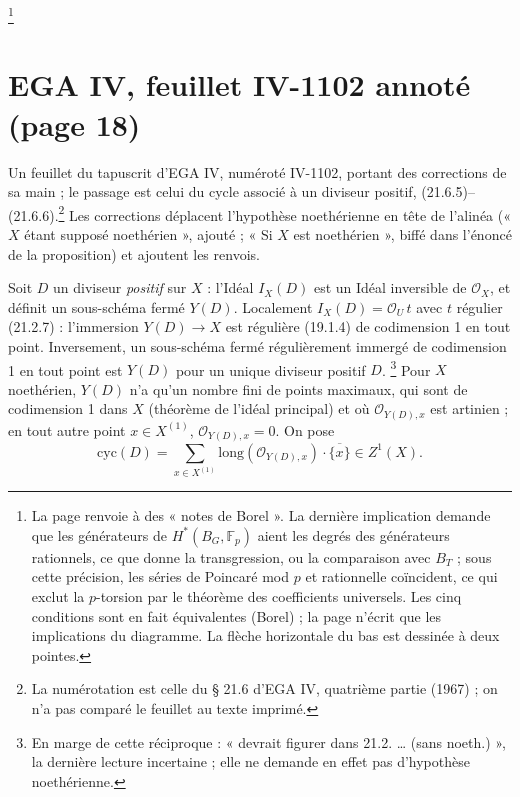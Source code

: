 \documentclass[11pt,a4paper]{article}
\begin{document}
\footnote{La page renvoie à des « notes de Borel ». La dernière implication
demande que les générateurs de $H^{*}(B_{G},\mathbb{F}_{p})$ aient les degrés
des générateurs rationnels, ce que donne la transgression, ou la
comparaison avec $B_{T}$ ; sous cette précision, les séries de Poincaré mod
$p$ et rationnelle coïncident, ce qui exclut la $p$-torsion par le théorème
des coefficients universels. Les cinq conditions sont en fait équivalentes
(Borel) ; la page n'écrit que les implications du diagramme. La flèche
horizontale du bas est dessinée à deux pointes.}

\section*{EGA IV, feuillet IV-1102 annoté (page 18)}

Un feuillet du tapuscrit d'EGA IV, numéroté IV-1102, portant des corrections
de sa main ; le passage est celui du cycle associé à un diviseur positif,
(21.6.5)--(21.6.6).\footnote{La numérotation est celle du § 21.6 d'EGA IV,
quatrième partie (1967) ; on n'a pas comparé le feuillet au texte imprimé.}
Les corrections déplacent l'hypothèse noethérienne en tête de l'alinéa
(« $X$ étant supposé noethérien », ajouté ; « Si $X$ est noethérien », biffé
dans l'énoncé de la proposition) et ajoutent les renvois.

Soit $D$ un diviseur \emph{positif} sur $X$ : l'Idéal $I_{X}(D)$ est un
Idéal inversible de $\mathcal{O}_{X}$, et définit un sous-schéma fermé
$Y(D)$. Localement $I_{X}(D) = \mathcal{O}_{U}\,t$ avec $t$ régulier
(21.2.7) : l'immersion $Y(D) \to X$ est régulière (19.1.4) de codimension 1
en tout point. Inversement, un sous-schéma fermé régulièrement immergé de
codimension 1 en tout point est $Y(D)$ pour un unique diviseur positif $D$.
\footnote{En marge de cette réciproque : « devrait figurer dans 21.2.
\ldots{} (sans noeth.) », la dernière lecture incertaine ; elle ne demande en
effet pas d'hypothèse noethérienne.}
Pour $X$ noethérien, $Y(D)$ n'a qu'un nombre fini de points maximaux, qui
sont de codimension 1 dans $X$ (théorème de l'idéal principal) et où
$\mathcal{O}_{Y(D),x}$ est artinien ; en tout autre point $x \in X^{(1)}$,
$\mathcal{O}_{Y(D),x} = 0$. On pose
\[
  \mathrm{cyc}(D) = \sum_{x \in X^{(1)}} \mathrm{long}(\mathcal{O}_{Y(D),x})
  \cdot \overline{\{x\}} \in Z^{1}(X). \tag{21.6.5.1}
\]
\end{document}
